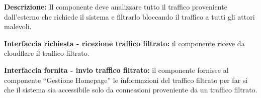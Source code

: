 \begin{listaPersonale}[]{}
    \elemento[Cloudflare]{}

    \textbf{Descrizione:} Il componente deve analizzare tutto il traffico proveniente dall'esterno che richiede il sistema e filtrarlo bloccando il traffico a tutti gli attori malevoli.

    \textbf{Interfaccia richiesta - ricezione traffico filtrato:} il componente riceve da cloudflare il traffico filtrato.

    \textbf{Interfaccia fornita - invio traffico filtrato:} il componente fornisce al componente “Gestione Homepage” le informazioni del traffico filtrato per far si che il sistema sia accessibile solo da connessioni proveniente da un traffico filtrato.

\end{listaPersonale}